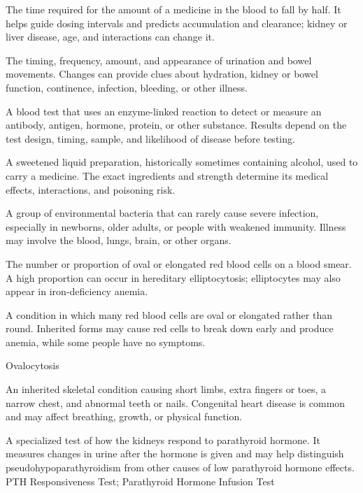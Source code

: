  The time required for the amount of a medicine in the blood to fall by half. It helps guide dosing intervals and predicts accumulation and clearance; kidney or liver disease, age, and interactions can change it.

 The timing, frequency, amount, and appearance of urination and bowel movements. Changes can provide clues about hydration, kidney or bowel function, continence, infection, bleeding, or other illness.

 A blood test that uses an enzyme-linked reaction to detect or measure an antibody, antigen, hormone, protein, or other substance. Results depend on the test design, timing, sample, and likelihood of disease before testing.

 A sweetened liquid preparation, historically sometimes containing alcohol, used to carry a medicine. The exact ingredients and strength determine its medical effects, interactions, and poisoning risk.

 A group of environmental bacteria that can rarely cause severe infection, especially in newborns, older adults, or people with weakened immunity. Illness may involve the blood, lungs, brain, or other organs.

 The number or proportion of oval or elongated red blood cells on a blood smear. A high proportion can occur in hereditary elliptocytosis; elliptocytes may also appear in iron-deficiency anemia.

 A condition in which many red blood cells are oval or elongated rather than round. Inherited forms may cause red cells to break down early and produce anemia, while some people have no symptoms.

\synonyms
Ovalocytosis

 An inherited skeletal condition causing short limbs, extra fingers or toes, a narrow chest, and abnormal teeth or nails. Congenital heart disease is common and may affect breathing, growth, or physical function.

 A specialized test of how the kidneys respond to parathyroid hormone. It measures changes in urine after the hormone is given and may help distinguish pseudohypoparathyroidism from other causes of low parathyroid hormone effects.
\synonyms
PTH Responsiveness Test; Parathyroid Hormone Infusion Test

